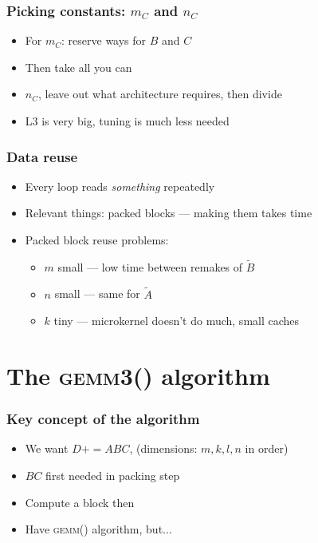 \documentclass{beamer}
\newcommand*{\pluseq}{\mathrel{{+}{=}}}
\newcommand*{\gemmt}{{\textsc{gemm3()}}}
\newcommand*{\gemm}{{\textsc{gemm()}}}
\begin{document}
\begin{frame}
  \frametitle{Picking constants: $m_C$ and $n_C$}
  \begin{itemize}
  \item For $m_C$: reserve ways for $B$ and $C$
  \item Then take all you can
  \item $n_C$, leave out what architecture requires, then divide
  \item L3 is very big, tuning is much less needed
  \end{itemize}
\end{frame}

\begin{frame}
  \frametitle{Data reuse}
  \begin{itemize}
  \item Every loop reads \emph{something} repeatedly
  \item Relevant things: packed blocks --- making them takes time
  \item Packed block reuse problems:
    \begin{itemize}
    \item $m$ small --- low time between remakes of $\tilde{B}$
    \item $n$ small --- same for $\tilde{A}$
    \item $k$ tiny --- microkernel doesn't do much, small caches
    \end{itemize}
  \end{itemize}
\end{frame}

\section[\gemmt{}]{The \gemmt{} algorithm}
\begin{frame}
  \frametitle{Key concept of the algorithm}
  \begin{itemize}
  \item We want $D \pluseq ABC$, (dimensions: $m, k, l, n$ in order)
  \item $BC$ first needed in packing step
  \item Compute a block then
  \item Have \gemm{} algorithm, but...
  \end{itemize}
\end{frame}
\end{document}
